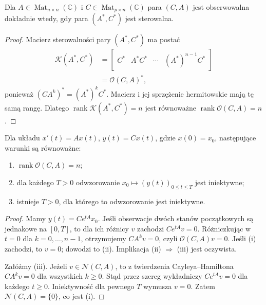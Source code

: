 \begin{twierdzenie}
\label{thm:lin25-duality}
Dla \(A\in\operatorname{Mat}_{n\times n}(\mathbb C)\)
i \(C\in\operatorname{Mat}_{p\times n}(\mathbb C)\)
para \((C,A)\) jest obserwowalna
dokładnie wtedy, gdy
para \((A^*,C^*)\)
jest sterowalna.
\end{twierdzenie}
\begin{proof}
Macierz sterowalności
pary \((A^*,C^*)\) ma postać
\[
 \begin{aligned}
 \mathcal K(A^*,C^*)
 &=
 \begin{bmatrix}
 C^*&A^*C^*&\cdots&(A^*)^{n-1}C^*
 \end{bmatrix}\\
 &=\mathcal O(C,A)^*,
 \end{aligned}
\]
ponieważ
\((CA^k)^*=(A^*)^kC^*\).
Macierz i jej sprzężenie
hermitowskie mają tę samą rangę.
Dlatego
\(\operatorname{rank}\mathcal K(A^*,C^*)=n\)
jest równoważne
\(\operatorname{rank}\mathcal O(C,A)=n\).
\end{proof}

\begin{twierdzenie}
\label{thm:lin25-cont-observe}
Dla układu
\(x'(t)=Ax(t)\),
\(y(t)=Cx(t)\),
gdzie \(x(0)=x_0\),
następujące warunki
są równoważne:
\begin{enumerate}[label=\textup{(\roman*)}]
 \item \(\operatorname{rank}\mathcal O(C,A)=n\);
 \item dla każdego \(T>0\)
 odwzorowanie
 \(x_0\mapsto(y(t))_{0\le t\le T}\)
 jest iniektywne;
 \item istnieje \(T>0\),
 dla którego to odwzorowanie
 jest iniektywne.
\end{enumerate}
\end{twierdzenie}
\begin{proof}
Mamy \(y(t)=Ce^{tA}x_0\).
Jeśli obserwacje dwóch stanów
początkowych są jednakowe
na \([0,T]\),
to dla ich różnicy \(v\)
zachodzi \(Ce^{tA}v=0\).
Różniczkując w \(t=0\)
dla \(k=0,\ldots,n-1\),
otrzymujemy
\(CA^kv=0\), czyli
\(\mathcal O(C,A)v=0\).
Jeśli (i) zachodzi,
to \(v=0\);
dowodzi to (ii).
Implikacja (ii) \(\Rightarrow\) (iii)
jest oczywista.

Załóżmy (iii).
Jeżeli
\(v\in\mathcal N(C,A)\),
to z twierdzenia
Cayleya--Hamiltona
\(CA^kv=0\)
dla wszystkich \(k\ge0\).
Stąd przez szereg wykładniczy
\(Ce^{tA}v=0\)
dla każdego \(t\ge0\).
Iniektywność dla pewnego \(T\)
wymusza \(v=0\).
Zatem \(\mathcal N(C,A)=\{0\}\),
co jest (i).
\end{proof}

